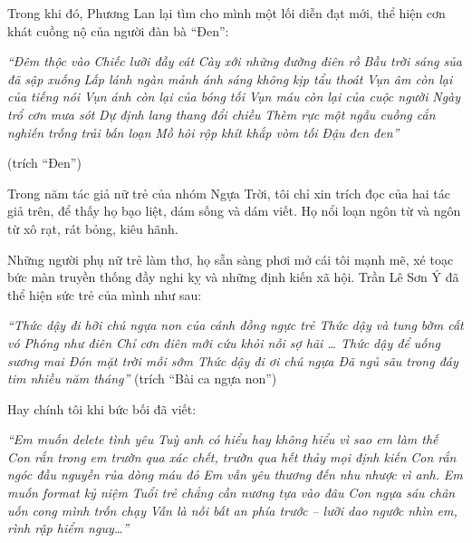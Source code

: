 \documentclass[../main.tex]{subfiles}
\begin{document}
\begin{multicols}{2}
Trong khi đó, Phương Lan lại tìm cho mình một lối diễn đạt mới, thể hiện cơn khát cuồng nộ của người đàn bà “Đen”: 
\begin{blockquote}
        
\textit{“Đêm thộc vào}        
\textit{Chiếc lưỡi đầy cát}        
\textit{Cày xới những đường điên rồ}        
\textit{Bầu trời sáng sủa đã sập xuống}        
\textit{Lấp lánh ngàn mảnh ánh sáng không kịp tẩu thoát}        
\textit{Vụn âm còn lại của tiếng nói}        
\textit{Vụn ánh còn lại của bóng tối}        
\textit{Vụn máu còn lại của cuộc người}        
\textit{Ngày trổ cơn mưa sót}        
\textit{Dự định lang thang đổi chiều}        
\textit{Thèm rực một ngẫu cuồng cắn nghiến trống trải bấn loạn}        
\textit{Mồ hôi rộp khít khắp vòm tối}        
\textit{Đậu đen đen”}        
        
(trích “Đen”) 

\end{blockquote}
 
Trong năm tác giả nữ trẻ của nhóm Ngựa Trời, tôi chỉ xin trích đọc của hai tác giả trên, để thấy họ bạo liệt, dám sống và dám viết. Họ nổi loạn ngôn từ và ngôn từ xô rạt, rát bỏng, kiêu hãnh.  
 
Những người phụ nữ trẻ làm thơ, họ sẵn sàng phơi mở cái tôi mạnh mẽ, xé toạc bức màn truyền thống đầy nghi kỵ và những định kiến xã hội. Trần Lê Sơn Ý đã thể hiện sức trẻ của mình như sau:  
\begin{blockquote}
       
\textit{“Thức dậy đi hỡi chú ngựa non của cánh đồng ngực trẻ        
Thức dậy và tung bờm cất vó        
Phóng như điên        
Chỉ cơn điên mới cứu khỏi nỗi sợ hãi        
…        
Thức dậy để uống sương mai        
Đón mặt trời mỗi sớm        
Thức dậy đi ơi chú ngựa        
Đã ngủ sâu trong đáy tim nhiều năm tháng”         
}        
(trích “Bài ca ngựa non”) 

\end{blockquote}
 
Hay chính tôi khi bức bối đã viết:         
\begin{blockquote}
        
\textit{“Em muốn delete tình yêu}        
\textit{Tuỳ anh có hiểu hay không hiểu vì sao em làm thế}        
\textit{Con rắn trong em trườn qua xác chết, trườn qua hết thảy mọi định kiến}        
\textit{Con rắn ngóc đầu nguyền rủa dòng máu đỏ}        
\textit{Em vẫn yêu thương đến nhu nhược vì anh.}        
\textit{Em muốn format kỷ niệm}        
\textit{Tuổi trẻ chẳng cần nương tựa vào đâu}        
\textit{Con ngựa sáu chân uốn cong mình trốn chạy} 
\textit{Vẫn là nỗi bất an phía trước – lưỡi dao ngước nhìn em, rình rập hiểm nguy…”} 
        

\end{blockquote}
\end{multicols}
\end{document}

